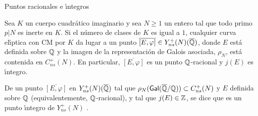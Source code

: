 \begin{subsection}{Puntos racionales e \'{\i}ntegros}
\begin{propoPuntosEnterosCuerpoQuad}\label{thm:propoPuntosEnterosCuerpoQuad}
 Sea $K$ un cuerpo cuadr\'{a}tico imaginario y sea $N\geq 1$ un entero tal que
 todo primo $p|N$ es inerte en $K$. Si el n\'{u}mero de clases de $K$ es igual 
 a $1$, cualquier curva el\'{\i}ptica con CM por $K$ da lugar a un punto
 $\overline{[E,\varphi]}\in Y_{ns}^{+}(N)(\overline{\mathbb{Q}})$, donde $E$ est\'{a}
 definida sobre $\mathbb{Q}$ y la imagen de la representaci\'{o}n de Galois
 asociada, $\rho_{N}$, est\'{a} contenida en $C_{ns}^{+}(N)$. En particular,
 $\overline{[E,\varphi]}$ es un punto $\mathbb{Q}$-racional y $j(E)$ es \'{\i}ntegro.
\end{propoPuntosEnterosCuerpoQuad}
De un punto $\overline{[E,\varphi]}$ en $Y_{ns}^{+}(N)(\overline{\mathbb{Q}})$ tal que
$\rho_{N}(\mathsf{Gal}(\overline{\mathbb{Q}}/\mathbb{Q}))\subset C_{ns}^{+}(N)$ y $E$ definida sobre $\mathbb{Q}$
(equivalentemente, $\mathbb{Q}$-racional), y tal que $j(E)\in\mathbb{Z}$, se dice que es
un punto \'{\i}ntegro de $Y_{ns}^{+}(N)$ \cite{serre}.

\end{subsection}
